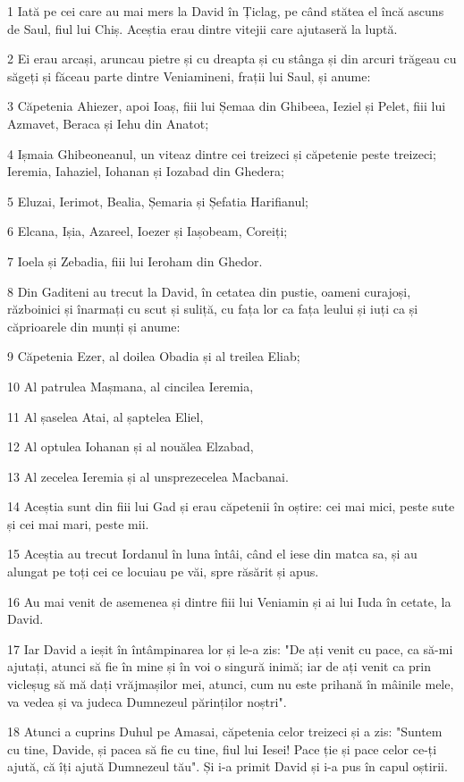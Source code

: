 \par 1 Iată pe cei care au mai mers la David în Țiclag, pe când stătea el încă ascuns de Saul, fiul lui Chiș. Aceștia erau dintre vitejii care ajutaseră la luptă.
\par 2 Ei erau arcași, aruncau pietre și cu dreapta și cu stânga și din arcuri trăgeau cu săgeți și făceau parte dintre Veniamineni, frații lui Saul, și anume:
\par 3 Căpetenia Ahiezer, apoi Ioaș, fiii lui Șemaa din Ghibeea, Ieziel și Pelet, fiii lui Azmavet, Beraca și Iehu din Anatot;
\par 4 Ișmaia Ghibeoneanul, un viteaz dintre cei treizeci și căpetenie peste treizeci; Ieremia, Iahaziel, Iohanan și Iozabad din Ghedera;
\par 5 Eluzai, Ierimot, Bealia, Șemaria și Șefatia Harifianul;
\par 6 Elcana, Ișia, Azareel, Ioezer și Iașobeam, Coreiți;
\par 7 Ioela și Zebadia, fiii lui Ieroham din Ghedor.
\par 8 Din Gaditeni au trecut la David, în cetatea din pustie, oameni curajoși, războinici și înarmați cu scut și suliță, cu fața lor ca fața leului și iuți ca și căprioarele din munți și anume:
\par 9 Căpetenia Ezer, al doilea Obadia și al treilea Eliab;
\par 10 Al patrulea Mașmana, al cincilea Ieremia,
\par 11 Al șaselea Atai, al șaptelea Eliel,
\par 12 Al optulea Iohanan și al nouălea Elzabad,
\par 13 Al zecelea Ieremia și al unsprezecelea Macbanai.
\par 14 Aceștia sunt din fiii lui Gad și erau căpetenii în oștire: cei mai mici, peste sute și cei mai mari, peste mii.
\par 15 Aceștia au trecut Iordanul în luna întâi, când el iese din matca sa, și au alungat pe toți cei ce locuiau pe văi, spre răsărit și apus.
\par 16 Au mai venit de asemenea și dintre fiii lui Veniamin și ai lui Iuda în cetate, la David.
\par 17 Iar David a ieșit în întâmpinarea lor și le-a zis: "De ați venit cu pace, ca să-mi ajutați, atunci să fie în mine și în voi o singură inimă; iar de ați venit ca prin vicleșug să mă dați vrăjmașilor mei, atunci, cum nu este prihană în mâinile mele, va vedea și va judeca Dumnezeul părinților noștri".
\par 18 Atunci a cuprins Duhul pe Amasai, căpetenia celor treizeci și a zis: "Suntem cu tine, Davide, și pacea să fie cu tine, fiul lui Iesei! Pace ție și pace celor ce-ți ajută, că îți ajută Dumnezeul tău". Și i-a primit David și i-a pus în capul oștirii.
